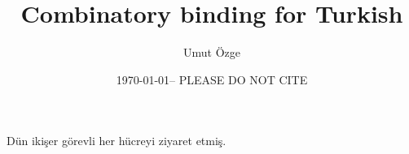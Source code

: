 \documentclass[11pt,a4paper]{article}
\title{Combinatory binding for Turkish}
\author{Umut \"Ozge}
\date{\today -- PLEASE DO NOT CITE}
\begin{document}
Dün ikişer görevli her hücreyi ziyaret etmiş.
\end{document}
